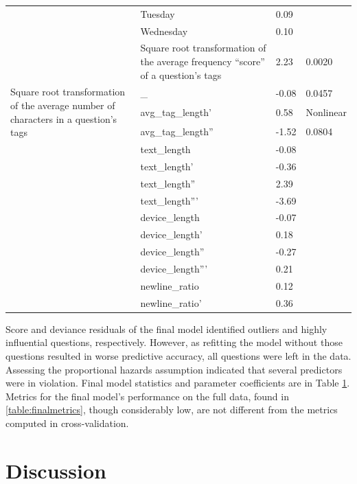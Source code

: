 \documentclass{article}
\begin{document}
\begin{table}[ht]
\begin{tabular}{|p{1.5cm}|p{6cm}|p{2.5cm}|p{2.5cm}|}
  & Tuesday & 0.09 & \\ 
  & Wednesday & 0.10 & \\ 
  \hline
  & Square root transformation of the average frequency ``score'' of a question's tags & 2.23 & 0.0020 \\ 
  \hline
  \multirow{ 3 }{ 2cm }{ Square root transformation of the average number of characters in a question's tags } & _ & -0.08 & 0.0457\\ 
  & avg\_tag\_length' & 0.58 & Nonlinear \\ 
  & avg\_tag\_length'' & -1.52 & 0.0804\\ 
  \hline
  & text\_length & -0.08 \\ 
  & text\_length' & -0.36 \\ 
  & text\_length'' & 2.39 \\
  & text\_length''' & -3.69 \\ 
  \hline
  & device\_length & -0.07 \\ 
  & device\_length' & 0.18 \\ 
  & device\_length'' & -0.27 \\ 
  & device\_length''' & 0.21 \\ 
  \hline
  & newline\_ratio & 0.12 \\ 
  & newline\_ratio' & 0.36 \\ 
   \hline
\end{tabular}
\label{table:coefficients}
\end{table}

Score and deviance residuals of the final model identified outliers and highly influential questions, respectively. However, as refitting the model without those questions resulted in worse predictive accuracy, all questions were left in the data. Assessing the proportional hazards assumption indicated that several predictors were in violation. Final model statistics and parameter coefficients are in Table \ref{table:coefficients}. Metrics for the final model's performance on the full data, found in \ref{table:finalmetrics}, though considerably low, are not different from the metrics computed in cross-validation.

\section*{Discussion}
\end{document}
